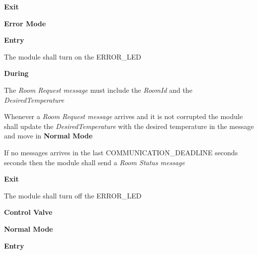 \begin{req_enum}
\begin{req_enum}[label*=\arabic*.]
\begin{req_enum}[label*=\arabic*.]
							\item \textbf{Exit}
						\end{req_enum}

					\item \textbf{Error Mode}
						\begin{req_enum}[label*=\arabic*.]
							\item \textbf{Entry}
								\begin{req_enum}[label*=\arabic*.]
									\item The module shall turn on the ERROR\_LED
								\end{req_enum}

							\item \textbf{During}
							\begin{req_enum}[label*=\arabic*.]
								\item The \textit{Room Request message} must include the \textit{RoomId} and the \textit{DesiredTemperature}
								\item Whenever a \textit{Room Request message} arrives and it is not corrupted the module shall update the \textit{DesiredTemperature} with the desired temperature in the message and move in \textbf{Normal Mode}
								\item If no messages arrives in the last COMMUNICATION\_DEADLINE seconds  seconds then the module shall send a \textit{Room Status message}
							\end{req_enum}

							\item \textbf{Exit}
								\begin{req_enum}[label*=\arabic*.]
									\item The module shall turn off the ERROR\_LED
								\end{req_enum}
						\end{req_enum}
				\end{req_enum}
			\item \textbf{Control Valve}
				\begin{req_enum}[label*=\arabic*.]
					\item \textbf{Normal Mode}
						\begin{req_enum}[label*=\arabic*.]
							\item \textbf{Entry}


\end{req_enum}
\end{req_enum}
\end{req_enum}
